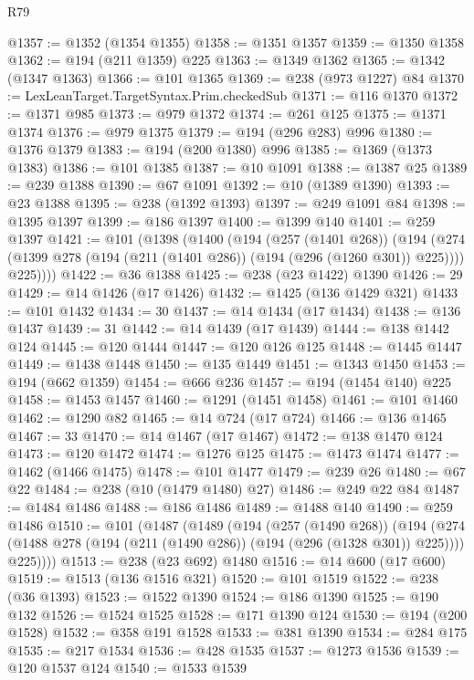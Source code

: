 \begin{lexlean}{R79}
\begin{coremodule}
@1357 := @1352 (@1354 @1355)
@1358 := @1351 @1357
@1359 := @1350 @1358
@1362 := @194 (@211 @1359) @225
@1363 := @1349 @1362
@1365 := @1342 (@1347 @1363)
@1366 := @101 @1365
@1369 := @238 (@973 @1227) @84
@1370 := LexLeanTarget.TargetSyntax.Prim.checkedSub
@1371 := @116 @1370
@1372 := @1371 @985
@1373 := @979 @1372
@1374 := @261 @125
@1375 := @1371 @1374
@1376 := @979 @1375
@1379 := @194 (@296 @283) @996
@1380 := @1376 @1379
@1383 := @194 (@200 @1380) @996
@1385 := @1369 (@1373 @1383)
@1386 := @101 @1385
@1387 := @10 @1091
@1388 := @1387 @25
@1389 := @239 @1388
@1390 := @67 @1091
@1392 := @10 (@1389 @1390)
@1393 := @23 @1388
@1395 := @238 (@1392 @1393)
@1397 := @249 @1091 @84
@1398 := @1395 @1397
@1399 := @186 @1397
@1400 := @1399 @140
@1401 := @259 @1397
@1421 := @101
    (@1398
      (@1400
        (@194
          (@257 (@1401 @268))
          (@194
            (@274 (@1399 @278 (@194 (@211 (@1401 @286)) (@194 (@296 (@1260 @301)) @225))))
            @225))))
@1422 := @36 @1388
@1425 := @238 (@23 @1422) @1390
@1426 := 29
@1429 := @14 @1426 (@17 @1426)
@1432 := @1425 (@136 @1429 @321)
@1433 := @101 @1432
@1434 := 30
@1437 := @14 @1434 (@17 @1434)
@1438 := @136 @1437
@1439 := 31
@1442 := @14 @1439 (@17 @1439)
@1444 := @138 @1442 @124
@1445 := @120 @1444
@1447 := @120 @126 @125
@1448 := @1445 @1447
@1449 := @1438 @1448
@1450 := @135 @1449
@1451 := @1343 @1450
@1453 := @194 (@662 @1359)
@1454 := @666 @236
@1457 := @194 (@1454 @140) @225
@1458 := @1453 @1457
@1460 := @1291 (@1451 @1458)
@1461 := @101 @1460
@1462 := @1290 @82
@1465 := @14 @724 (@17 @724)
@1466 := @136 @1465
@1467 := 33
@1470 := @14 @1467 (@17 @1467)
@1472 := @138 @1470 @124
@1473 := @120 @1472
@1474 := @1276 @125
@1475 := @1473 @1474
@1477 := @1462 (@1466 @1475)
@1478 := @101 @1477
@1479 := @239 @26
@1480 := @67 @22
@1484 := @238 (@10 (@1479 @1480) @27)
@1486 := @249 @22 @84
@1487 := @1484 @1486
@1488 := @186 @1486
@1489 := @1488 @140
@1490 := @259 @1486
@1510 := @101
    (@1487
      (@1489
        (@194
          (@257 (@1490 @268))
          (@194
            (@274 (@1488 @278 (@194 (@211 (@1490 @286)) (@194 (@296 (@1328 @301)) @225))))
            @225))))
@1513 := @238 (@23 @692) @1480
@1516 := @14 @600 (@17 @600)
@1519 := @1513 (@136 @1516 @321)
@1520 := @101 @1519
@1522 := @238 (@36 @1393)
@1523 := @1522 @1390
@1524 := @186 @1390
@1525 := @190 @132
@1526 := @1524 @1525
@1528 := @171 @1390 @124
@1530 := @194 (@200 @1528)
@1532 := @358 @191 @1528
@1533 := @381 @1390
@1534 := @284 @175
@1535 := @217 @1534
@1536 := @428 @1535
@1537 := @1273 @1536
@1539 := @120 @1537 @124
@1540 := @1533 @1539

\end{coremodule}
\end{lexlean}
